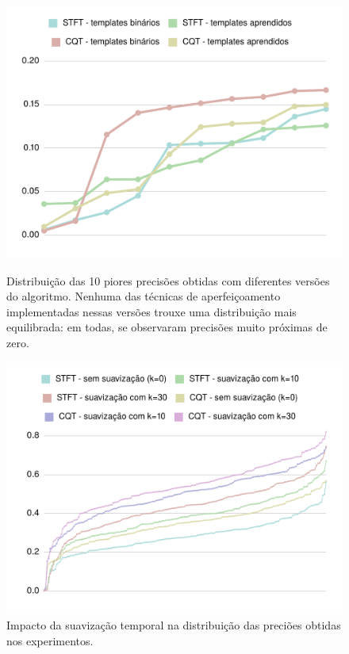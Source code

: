     \begin{figure}[htb]
        \begin{center}
            \includegraphics[width=13cm]{figuras/05-distribuicoes-inicial.png}
            \caption{\label{fig:exp:dist:primeiras}Distribuição das 10 piores precisões obtidas com diferentes versões do algoritmo. Nenhuma das técnicas de aperfeiçoamento implementadas nessas versões trouxe uma distribuição mais equilibrada: em todas, se observaram precisões muito próximas de zero.}
            
            
            \includegraphics[width=13cm]{figuras/06-distribuicoes-stft-bin-smooth.png}
            \caption{\label{fig:exp:dist:stft_smooth}Impacto da suavização temporal na distribuição das preciões obtidas nos experimentos.}
        \end{center}
    \end{figure}


